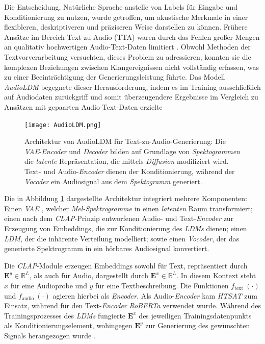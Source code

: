 \documentclass[
  a4paper,  %
  twoside,  %
  bibliography=totoc,
  headsepline,
  cleardoublepage=empty,
  parskip=half,
  draft=false
]{scrbook}
\begin{document}
Die Entscheidung, Natürliche Sprache anstelle von Labels für Eingabe und Konditionierung zu nutzen, wurde getroffen, um akustische Merkmale in einer flexibleren, deskriptiveren und präziseren Weise darstellen zu können. Frühere Ansätze im Bereich Text-zu-Audio (TTA) waren durch das Fehlen großer Mengen an qualitativ hochwertigen Audio-Text-Daten limitiert \cite{liu_separate_2022}. Obwohl Methoden der Textvorverarbeitung \cite{gemmeke_audio_2017, yang_diffsound_2023} versuchten, dieses Problem zu adressieren, konnten sie die komplexen Beziehungen zwischen Klangereignissen nicht vollständig erfassen, was zu einer Beeinträchtigung der Generierungsleistung führte. Das Modell \emph{AudioLDM} begegnete dieser Herausforderung, indem es im Training ausschließlich auf Audiodaten zurückgriff und somit überzeugendere Ergebnisse im Vergleich zu Ansätzen mit gepaarten Audio-Text-Daten erzielte \cite{liu_audioldm_2023}


\begin{figure}[h]
  \centering
  \texttt{[image: AudioLDM.png]}
  \caption[AudioLDM Architektur]{Architektur von AudioLDM für Text-zu-Audio-Generierung: Die \emph{VAE}-\emph{Encoder} und \emph{Decoder} bilden auf Grundlage von \emph{Spektogrammen} die \emph{latente} Repräsentation, die mittels \emph{Diffusion} modifiziert wird. Text- und Audio-\emph{Encoder} dienen der Konditionierung, während der \emph{Vocoder} ein Audiosignal aus dem \emph{Spektogramm} generiert. \cite{liu_audioldm_2023}}
  \label{fig:AudioLDM}
\end{figure} 

Die in Abbildung \ref{fig:AudioLDM} dargestellte Architektur integriert mehrere Komponenten: Einen \emph{VAE} \cite{kingma_auto-encoding_2022}, welcher \emph{Mel-Spektrogramme} in einen \emph{latenten} Raum transformiert; einen nach dem \emph{CLAP}-Prinzip \cite{wu_large-scale_2023} entworfenen Audio- und Text-\emph{Encoder} zur Erzeugung von Embeddings, die zur Konditionierung des \emph{LDMs} dienen; einen \emph{LDM}, der die inhärente Verteilung modelliert; sowie einen \emph{Vocoder}, der das generierte Spektrogramm in ein hörbares Audiosignal konvertiert. \cite{liu_audioldm_2023}

Die \emph{CLAP}-Module erzeugen Embeddings sowohl für Text, repräsentiert durch $\boldsymbol{E}^y \in \mathbb{R}^L$, als auch für Audio, dargestellt durch $\boldsymbol{E}^x \in \mathbb{R}^L$. In diesem Kontext steht $x$ für eine Audioprobe und $y$ für eine Textbeschreibung. Die Funktionen $f_{\text {text }}(\cdot)$ und $f_{\text {audio }}(\cdot)$ agieren hierbei als \emph{Encoder}. Als Audio-\emph{Encoder} kam \emph{HTSAT} \cite{chen_hts-at_2022} zum Einsatz, während für den Text-\emph{Encoder} \emph{RoBERTa} \cite{liu_roberta_2019} verwendet wurde. Während des Trainingsprozesses des \emph{LDMs} fungierte $\boldsymbol{E}^x$ des jeweiligen Trainingsdatenpunkts als Konditionierungselement, wohingegen $\boldsymbol{E}^y$ zur Generierung des gewünschten Signals herangezogen wurde \cite{liu_audioldm_2023}.
\end{document}

